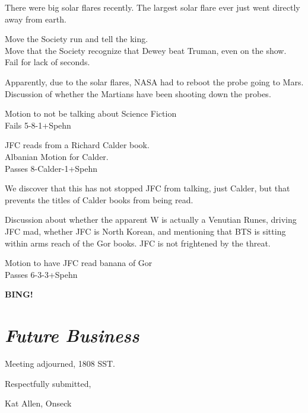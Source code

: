 \documentclass[10pt]{article}
\newcommand{\bing}{{\bf BING!} }
\newcommand{\goto}[1]{\bing \vskip 12pt \section*{{\em{#1}}}}
\begin{document}
There were big solar flares recently.  The largest solar flare ever
just went directly away from earth.

Move the Society run and tell the king.\\
Move that the Society recognize that Dewey beat Truman, even on the
show.\\
Fail for lack of seconds.

Apparently, due to the solar flares, NASA had to reboot the probe
going to Mars.
Discussion of whether the Martians have been shooting down the probes.

Motion to not be talking about Science Fiction\\
Fails 5-8-1+Spehn

JFC reads from a Richard Calder book.\\
Albanian Motion for Calder.\\
Passes 8-Calder-1+Spehn

We discover that this has not stopped JFC from talking, just Calder,
but that prevents the titles of Calder books from being read.

Discussion about whether the apparent W is actually a Venutian Runes,
driving JFC mad, whether JFC is North Korean, and mentioning that BTS
is sitting within arms reach of the Gor books. JFC is not frightened
by the threat.

Motion to have JFC read banana of Gor\\
Passes 6-3-3+Spehn

\goto{Future Business}

\vspace{12pt}

\noindent
Meeting adjourned, 1808 SST.

\vspace{18pt}

\centerline{Respectfully submitted,}
\centerline{Kat Allen,  Onseck}
\end{document}
